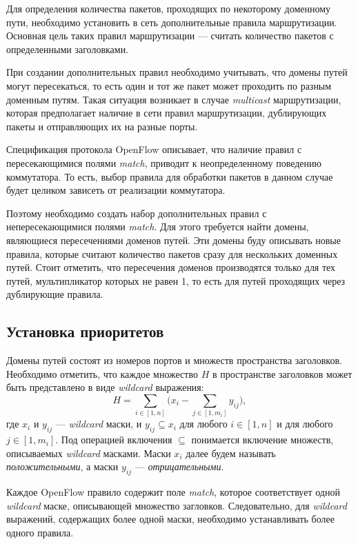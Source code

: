 \documentclass[../thesis.tex]{subfiles}
\begin{document}
Для определения количества пакетов, проходящих по некоторому доменному пути, необходимо установить в сеть дополнительные правила маршрутизации.
Основная цель таких правил маршрутизации --- считать количество пакетов с определенными заголовками.

При создании дополнительных правил необходимо учитывать, что домены путей могут пересекаться, то есть один и тот же пакет может проходить по разным доменным путям.
Такая ситуация возникает в случае \textit{multicast} маршрутизации, которая предполагает наличие в сети правил маршрутизации, дублирующих пакеты и отправляющих их на разные порты.

Спецификация протокола OpenFlow \cite{openflow15} описывает, что наличие правил с пересекающимися полями \textit{match}, приводит к неопределенному поведению коммутатора.
То есть, выбор правила для обработки пакетов в данном случае будет целиком зависеть от реализации коммутатора.

Поэтому необходимо создать набор дополнительных правил с непересекающимися полями \textit{match}.
Для этого требуется найти домены, являющиеся пересечениями доменов путей.
Эти домены буду описывать новые правила, которые считают количество пакетов сразу для нескольких доменных путей.
Стоит отметить, что пересечения доменов производятся только для тех путей, мультипликатор которых не равен 1, то есть для путей проходящих через дублирующие правила.

\subsection{Установка приоритетов}

Домены путей состоят из номеров портов и множеств пространства заголовков.
Необходимо отметить, что каждое множество $H$ в пространстве заголовков может быть представлено в виде \textit{wildcard} выражения:
\begin{equation}
H = \sum_{i\in[1,n]} {\big(x_i - \sum_{j\in[1,m_i]} {y_{ij}}\big)},
\end{equation}
где $x_i$ и $y_{ij}$ --- \textit{wildcard} маски, и $y_{ij}\subseteq x_i$ для любого $i\in [1,n]$ и для любого $j\in[1,m_i]$.
Под операцией включения $\subseteq$ понимается включение множеств, описываемых \textit{wildcard} масками.
Маски $x_i$ далее будем называть \textit{положительными}, а маски $y_{ij}$ --- \textit{отрицательными}.

Каждое OpenFlow правило содержит поле \textit{match}, которое соответствует одной \textit{wildcard} маске, описывающей множество загловков.
Следовательно, для \textit{wildcard} выражений, содержащих более одной маски, необходимо устанавливать более одного правила.
\end{document}
